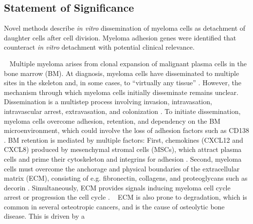 \subsection*{Statement of Significance}
Novel methods describe \textit{in vitro} dissemination of myeloma cells as detachment of
daughter cells after cell division. Myeloma adhesion genes were identified that
counteract \textit{in vitro} detachment with potential clinical relevance.
\newpage


\label{C1:introduction} %
\ %
Multiple myeloma arises from clonal expansion of malignant plasma cells in the
bone marrow (BM). At diagnosis, myeloma cells have disseminated to multiple
sites in the skeleton and, in some cases, to “virtually any tissue”
\cite{bladeExtramedullaryDiseaseMultiple2022,rajkumarInternationalMyelomaWorking2014}.
However, the mechanism through which myeloma cells initially disseminate remains
unclear. Dissemination is a multistep process involving invasion, intravasation,
intravascular arrest, extravasation, and colonization
\cite{zeissigTumourDisseminationMultiple2020}. To initiate dissemination,
myeloma cells overcome adhesion, retention, and dependency on the BM
microenvironment, which could involve the loss of adhesion factors such as CD138
\cite{akhmetzyanovaDynamicCD138Surface2020,garcia-ortizRoleTumorMicroenvironment2021}.
BM retention is mediated by multiple factors: First, chemokines (CXCL12 and
CXCL8) produced by mesenchymal stromal cells (MSCs), which attract plasma cells
and prime their cytoskeleton and integrins for adhesion
\cite{aggarwalChemokinesMultipleMyeloma2006,alsayedMechanismsRegulationCXCR42007}.
Second, myeloma cells must overcome the anchorage and physical boundaries of the
extracellular matrix (ECM), consisting of e.g. fibronectin, collagens, and
proteoglycans such as decorin
\cite{huDecorinmediatedSuppressionTumorigenesis2021,huangHigherDecorinLevels2015,katzAdhesionMoleculesLifelines2010,kiblerAdhesiveInteractionsHuman1998}.
Simultaneously, ECM provides signals inducing myeloma cell cycle arrest or
progression the cell cycle
\cite{huDecorinmediatedSuppressionTumorigenesis2021,katzAdhesionMoleculesLifelines2010}.
\ %
ECM is also prone to degradation, which is common in several osteotropic
cancers, and is the cause of osteolytic bone disease. This is driven by a
